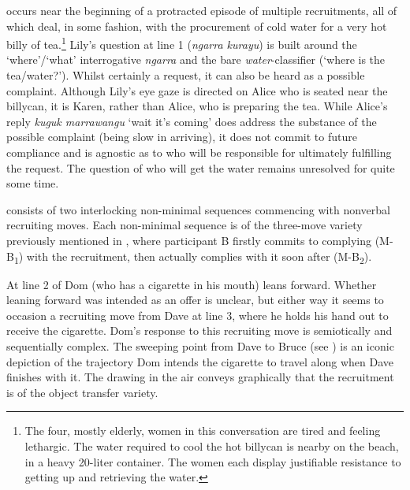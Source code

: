\documentclass[output=paper,nonflat,colorlinks,citecolor=brown]{langsci/langscibook}
\begin{document}
 occurs near the beginning of a protracted episode of multiple recruitments, all of which deal, in some fashion, with the procurement of cold water for a very hot billy of tea.\footnote{The four, mostly elderly, women in this conversation are tired and feeling lethargic. The water required to cool the hot billycan is nearby on the beach, in a heavy 20-liter container. The women each display justifiable resistance to getting up and retrieving the water.} Lily’s question at line 1 (\textit{ngarra kurayu}) is built around the ‘where’/‘what’ interrogative \textit{ngarra} and the bare \textit{water}-classifier (‘where is the tea/water?’). Whilst certainly a request, it can also be heard as a possible complaint. Although Lily’s eye gaze is directed on Alice who is seated near the billycan, it is Karen, rather than Alice, who is preparing the tea. While Alice’s reply \textit{kuguk marrawangu} ‘wait it’s coming’ does address the substance of the possible complaint (being slow in arriving), it does not commit to future compliance and is agnostic as to who will be responsible for ultimately fulfilling the request.  The question of who will get the water remains unresolved for quite some time.

 consists of two interlocking non-minimal sequences commencing with nonverbal recruiting moves. Each non-minimal sequence is of the three-move variety previously mentioned in , where participant B firstly commits to complying (M-B\textsubscript{1}) with the recruitment, then actually complies with it soon after (M-B\textsubscript{2}).

At line 2 of  Dom (who has a cigarette in his mouth) leans forward. Whether leaning forward was intended as an offer is unclear, but either way it seems to occasion a recruiting move from Dave at line 3, where he holds his hand out to receive the cigarette. Dom’s response to this recruiting move is semiotically and sequentially complex. The sweeping point from Dave to Bruce (see  ) is an iconic depiction of the trajectory Dom intends the cigarette to travel along when Dave finishes with it. The drawing in the air conveys graphically that the recruitment is of the object transfer variety.
\end{document}
